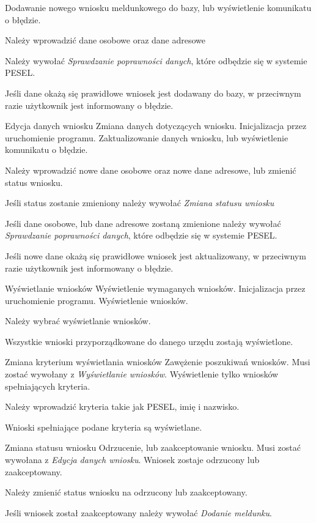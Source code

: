 \documentclass[12pt]{article}
\begin{document}
    {Dodawanie nowego wniosku meldunkowego do bazy, lub wyświetlenie komunikatu o błędzie.}
    {
        \item Należy wprowadzić dane osobowe oraz dane adresowe
        \item Należy wywołać \textit{Sprawdzanie poprawności danych}, które odbędzie się w systemie PESEL.
        \item Jeśli dane okażą się prawidłowe wniosek jest dodawany do bazy, w przeciwnym razie użytkownik jest informowany o błędzie.
    }
\scenario
    {Edycja danych wniosku}
    {Zmiana danych dotyczących wniosku.}
    {Inicjalizacja przez uruchomienie programu.}
    {Zaktualizowanie danych wniosku, lub wyświetlenie komunikatu o błędzie.}
    {
        \item Należy wprowadzić nowe dane osobowe oraz nowe dane adresowe, lub zmienić status wniosku.
        \item Jeśli status zostanie zmieniony należy wywołać \textit{Zmiana statusu wniosku}
        \item Jeśli dane osobowe, lub dane adresowe zostaną zmienione należy wywołać \textit{Sprawdzanie poprawności danych}, które odbędzie się w systemie PESEL.
        \item Jeśli nowe dane okażą się prawidłowe wniosek jest aktualizowany, w przeciwnym razie użytkownik jest informowany o błędzie.
    }
\scenario
    {Wyświetlanie wniosków}
    {Wyświetlenie wymaganych wniosków.}
    {Inicjalizacja przez uruchomienie programu.}
    {Wyświetlenie wniosków.}
    {
        \item Należy wybrać wyświetlanie wniosków.
        \item Wszystkie wnioski przyporządkowane do danego urzędu zostają wyświetlone.
    }
\scenario
    {Zmiana kryterium wyświetlania wniosków}
    {Zawężenie poszukiwań wniosków.}
    {Musi zostać wywołany z \textit{Wyświetlanie wniosków}.}
    {Wyświetlenie tylko wniosków spełniających kryteria.}
    {
        \item Należy wprowadzić kryteria takie jak PESEL, imię i nazwisko.
        \item Wnioski spełniające podane kryteria są wyświetlane.
    }
\scenario
    {Zmiana statusu wniosku}
    {Odrzucenie, lub zaakceptowanie wniosku.}
    {Musi zostać wywołana z \textit{Edycja danych wniosku}.}
    {Wniosek zostaje odrzucony lub zaakceptowany.}
    {
        \item Należy zmienić status wniosku na odrzucony lub zaakceptowany.
        \item Jeśli wniosek został zaakceptowany należy wywołać \textit{Dodanie meldunku}.
    }
\end{document}
